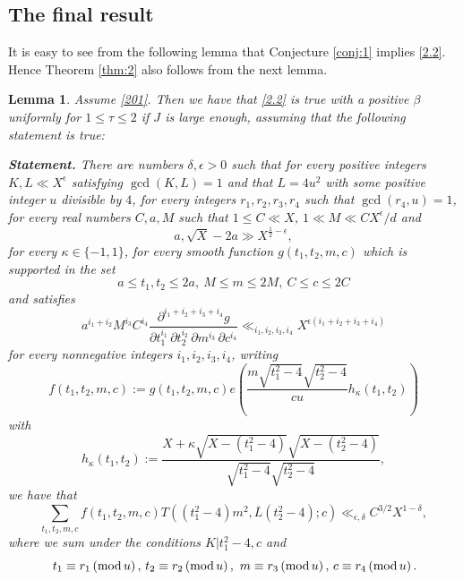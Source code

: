 \documentclass[12pt]{amsart}
\newtheorem{lemma}[theorem]{Lemma}
\theoremstyle{definition}
\numberwithin{equation}{section}
\begin{document}
\subsection{The final result}


It is easy to see from the following lemma that
Conjecture \ref{conj:1} implies \eqref{2.2}. Hence Theorem
\ref{thm:2} also follows from the next lemma.

\begin{lemma}\label{lem:13}Assume \eqref{201}. Then we
have that \eqref{2.2} is true with a positive $\beta$ uniformly for $
1\le\tau\le 2$ if $J$ is large enough, assuming that the following statement
is true:

{\bf Statement.} There are numbers $\delta ,\epsilon >0$ such that for every
positive integers $K,L\ll X^{\epsilon}$ satisfying $\gcd\left(K,L\right
)=1$ and
that $L=4u^2$ with some positive integer $u$ divisible by $4$, for every integers $
r_1,r_2,r_3,r_4$ such that
$\gcd\left(r_4,u\right)=1$, for every real numbers $C,a,M$ such that $
1\le C\ll X$, $1\ll M\ll CX^{\epsilon}/d$ and
\[a,\sqrt {X}-2a\gg X^{\frac 12-\epsilon},\]
for every $\kappa\in \{-1,1\}$, for every smooth function $g\left
(t_1,t_2,m,c\right)$ which is supported in
the set
\[a\le t_1,t_2\le 2a,\:M\le m\le 2M,\:C\le c\le 2C\]
and satisfies
\[a^{i_1+i_2}M^{i_3}C^{i_4}\frac {\partial^{i_1+i_2+i_3+i_4}g}{\partial
t_1^{i_1}\,\partial t_2^{i_2}\,\partial m^{i_3}\,\partial c^{i_4}}
\ll_{i_1,i_2,i_3,i_4}X^{\epsilon\left(i_1+i_2+i_3+i_4\right)}\]
for every nonnegative integers $i_1,i_2,i_3,i_4$, writing
\[f\left(t_1,t_2,m,c\right):=g\left(t_1,t_2,m,c\right)e\left(\frac {
m\sqrt {t_1^2-4}\sqrt {t_2^2-4}}{cu}h_{\kappa}\left(t_1,t_2\right
)\right)\]
with
\[h_{\kappa}\left(t_1,t_2\right):=\frac {X+\kappa\sqrt {X-\left(t_
1^2-4\right)}\sqrt {X-\left(t_2^2-4\right)}}{\sqrt {t_1^2-4}\sqrt {
t_2^2-4}},\]
we have that
\[\sum_{t_1,t_2,m,c}f\left(t_1,t_2,m,c\right)T\left(\left(t_1^2-4\right
)m^2,\overline L\left(t_2^2-4\right);c\right)\ll_{\epsilon ,\delta}
C^{3/2}X^{1-\delta},\]
where we sum under the conditions $K|t_1^2-4,c$ and
\[\,t_1\equiv r_1\left({\rm m}{\rm o}{\rm d}\,u\right),\,t_2\equiv 
r_2\left({\rm m}{\rm o}{\rm d}\,u\right),\,\,m\equiv r_3\left({\rm m}
{\rm o}{\rm d}\,u\right),\,c\equiv r_4\left({\rm m}{\rm o}{\rm d}\,
u\right).\]
\end{lemma}
\end{document}
